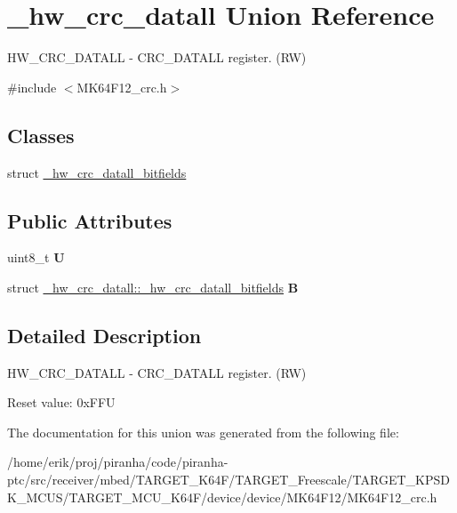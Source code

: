 \hypertarget{union__hw__crc__datall}{}\section{\+\_\+hw\+\_\+crc\+\_\+datall Union Reference}
\label{union__hw__crc__datall}


H\+W\+\_\+\+C\+R\+C\+\_\+\+D\+A\+T\+A\+LL -\/ C\+R\+C\+\_\+\+D\+A\+T\+A\+LL register. (RW)  




{\ttfamily \#include $<$M\+K64\+F12\+\_\+crc.\+h$>$}

\subsection*{Classes}
\begin{DoxyCompactItemize}
\item 
struct \hyperlink{struct__hw__crc__datall_1_1__hw__crc__datall__bitfields}{\+\_\+hw\+\_\+crc\+\_\+datall\+\_\+bitfields}
\end{DoxyCompactItemize}
\subsection*{Public Attributes}
\begin{DoxyCompactItemize}
\item 
uint8\+\_\+t {\bfseries U}\hypertarget{union__hw__crc__datall_a6417c66856d0bfee75286a41fd14f7f4}{}\label{union__hw__crc__datall_a6417c66856d0bfee75286a41fd14f7f4}

\item 
struct \hyperlink{struct__hw__crc__datall_1_1__hw__crc__datall__bitfields}{\+\_\+hw\+\_\+crc\+\_\+datall\+::\+\_\+hw\+\_\+crc\+\_\+datall\+\_\+bitfields} {\bfseries B}\hypertarget{union__hw__crc__datall_a6a079cbf8295ef8ece2412662cf9677b}{}\label{union__hw__crc__datall_a6a079cbf8295ef8ece2412662cf9677b}

\end{DoxyCompactItemize}


\subsection{Detailed Description}
H\+W\+\_\+\+C\+R\+C\+\_\+\+D\+A\+T\+A\+LL -\/ C\+R\+C\+\_\+\+D\+A\+T\+A\+LL register. (RW) 

Reset value\+: 0x\+F\+FU 

The documentation for this union was generated from the following file\+:\begin{DoxyCompactItemize}
\item 
/home/erik/proj/piranha/code/piranha-\/ptc/src/receiver/mbed/\+T\+A\+R\+G\+E\+T\+\_\+\+K64\+F/\+T\+A\+R\+G\+E\+T\+\_\+\+Freescale/\+T\+A\+R\+G\+E\+T\+\_\+\+K\+P\+S\+D\+K\+\_\+\+M\+C\+U\+S/\+T\+A\+R\+G\+E\+T\+\_\+\+M\+C\+U\+\_\+\+K64\+F/device/device/\+M\+K64\+F12/M\+K64\+F12\+\_\+crc.\+h\end{DoxyCompactItemize}
